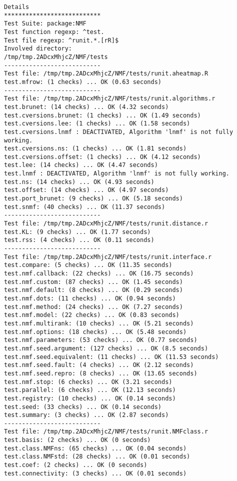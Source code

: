 \documentclass[10pt]{article}
\begin{document}
\begin{verbatim}
Details 
*************************** 
Test Suite: package:NMF 
Test function regexp: ^test. 
Test file regexp: ^runit.*.[rR]$ 
Involved directory: 
/tmp/tmp.2ADcxMhjcZ/NMF/tests 
--------------------------- 
Test file: /tmp/tmp.2ADcxMhjcZ/NMF/tests/runit.aheatmap.R 
test.mfrow: (1 checks) ... OK (0.63 seconds)
--------------------------- 
Test file: /tmp/tmp.2ADcxMhjcZ/NMF/tests/runit.algorithms.r 
test.brunet: (14 checks) ... OK (4.32 seconds)
test.cversions.brunet: (1 checks) ... OK (1.49 seconds)
test.cversions.lee: (1 checks) ... OK (1.58 seconds)
test.cversions.lnmf : DEACTIVATED, Algorithm 'lnmf' is not fully working.
test.cversions.ns: (1 checks) ... OK (1.81 seconds)
test.cversions.offset: (1 checks) ... OK (4.12 seconds)
test.lee: (14 checks) ... OK (4.47 seconds)
test.lnmf : DEACTIVATED, Algorithm 'lnmf' is not fully working.
test.ns: (14 checks) ... OK (4.93 seconds)
test.offset: (14 checks) ... OK (4.97 seconds)
test.port_brunet: (9 checks) ... OK (5.18 seconds)
test.snmf: (40 checks) ... OK (11.37 seconds)
--------------------------- 
Test file: /tmp/tmp.2ADcxMhjcZ/NMF/tests/runit.distance.r 
test.KL: (9 checks) ... OK (1.77 seconds)
test.rss: (4 checks) ... OK (0.11 seconds)
--------------------------- 
Test file: /tmp/tmp.2ADcxMhjcZ/NMF/tests/runit.interface.r 
test.compare: (5 checks) ... OK (11.35 seconds)
test.nmf.callback: (22 checks) ... OK (16.75 seconds)
test.nmf.custom: (87 checks) ... OK (1.45 seconds)
test.nmf.default: (8 checks) ... OK (0.29 seconds)
test.nmf.dots: (11 checks) ... OK (0.94 seconds)
test.nmf.method: (24 checks) ... OK (7.27 seconds)
test.nmf.model: (22 checks) ... OK (0.83 seconds)
test.nmf.multirank: (10 checks) ... OK (5.21 seconds)
test.nmf.options: (18 checks) ... OK (5.48 seconds)
test.nmf.parameters: (53 checks) ... OK (0.77 seconds)
test.nmf.seed.argument: (127 checks) ... OK (8.5 seconds)
test.nmf.seed.equivalent: (11 checks) ... OK (11.53 seconds)
test.nmf.seed.fault: (4 checks) ... OK (2.12 seconds)
test.nmf.seed.repro: (8 checks) ... OK (13.65 seconds)
test.nmf.stop: (6 checks) ... OK (3.21 seconds)
test.parallel: (6 checks) ... OK (12.13 seconds)
test.registry: (10 checks) ... OK (0.14 seconds)
test.seed: (33 checks) ... OK (0.14 seconds)
test.summary: (3 checks) ... OK (2.87 seconds)
--------------------------- 
Test file: /tmp/tmp.2ADcxMhjcZ/NMF/tests/runit.NMFclass.r 
test.basis: (2 checks) ... OK (0 seconds)
test.class.NMFns: (65 checks) ... OK (0.04 seconds)
test.class.NMFstd: (28 checks) ... OK (0.01 seconds)
test.coef: (2 checks) ... OK (0 seconds)
test.connectivity: (3 checks) ... OK (0.01 seconds)

\end{verbatim}
\end{document}
